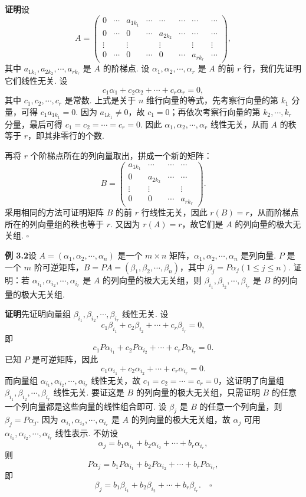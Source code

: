 \documentclass[UTF8,12pt,a4paper,fontset=fandol]{ctexart}
\begin{document}
\noindent\textbf{证明}\quad 设
\[
A=
\begin{pmatrix}
0 & \cdots & a_{1k_1} & \cdots & \cdots & \cdots & \cdots & \cdots\\
0 & \cdots & 0 & \cdots & a_{2k_2} & \cdots & \cdots & \cdots\\
\vdots &        & \vdots &        & \vdots &        & \vdots & \vdots\\
0 & \cdots & 0 & \cdots & 0 & \cdots & a_{rk_r} & \cdots
\end{pmatrix},
\]
其中 $a_{1k_1},a_{2k_2},\cdots,a_{rk_r}$ 是 $A$ 的阶梯点. 设 $\alpha_1,\alpha_2,\cdots,\alpha_r$ 是 $A$ 的前 $r$ 行，我们先证明它们线性无关. 设
\[
c_1\alpha_1+c_2\alpha_2+\cdots+c_r\alpha_r=0,
\]
其中 $c_1,c_2,\cdots,c_r$ 是常数. 上式是关于 $n$ 维行向量的等式，先考察行向量的第 $k_1$ 分量，可得 $c_1a_{1k_1}=0$. 因为 $a_{1k_1}\ne 0$，故 $c_1=0$；再依次考察行向量的第 $k_2,\cdots,k_r$ 分量，最后可得 $c_1=c_2=\cdots=c_r=0$. 因此 $\alpha_1,\alpha_2,\cdots,\alpha_r$ 线性无关，从而 $A$ 的秩等于 $r$，即其非零行的个数.

再将 $r$ 个阶梯点所在的列向量取出，拼成一个新的矩阵：
\[
B=
\begin{pmatrix}
a_{1k_1} & \cdots & \cdots & \cdots\\
0 & a_{2k_2} & \cdots & \cdots\\
\vdots & \vdots &        & \vdots\\
0 & 0 & \cdots & a_{rk_r}
\end{pmatrix}.
\]
采用相同的方法可证明矩阵 $B$ 的前 $r$ 行线性无关，因此 $r(B)=r$，从而阶梯点所在的列向量组的秩也等于 $r$. 又因为 $r(A)=r$，故它们是 $A$ 的列向量的极大无关组. $\square$

\noindent\textbf{例 3.2}\quad 设 $A=(\alpha_1,\alpha_2,\cdots,\alpha_n)$ 是一个 $m\times n$ 矩阵，$\alpha_1,\alpha_2,\cdots,\alpha_n$ 是列向量. $P$ 是一个 $m$ 阶可逆矩阵，$B=PA=(\beta_1,\beta_2,\cdots,\beta_n)$，其中 $\beta_j=P\alpha_j(1\le j\le n)$. 证明：若 $\alpha_{i_1},\alpha_{i_2},\cdots,\alpha_{i_r}$ 是 $A$ 的列向量的极大无关组，则 $\beta_{i_1},\beta_{i_2},\cdots,\beta_{i_r}$ 是 $B$ 的列向量的极大无关组.

\noindent\textbf{证明}\quad 先证明向量组 $\beta_{i_1},\beta_{i_2},\cdots,\beta_{i_r}$ 线性无关. 设
\[
c_1\beta_{i_1}+c_2\beta_{i_2}+\cdots+c_r\beta_{i_r}=0,
\]
即
\[
c_1P\alpha_{i_1}+c_2P\alpha_{i_2}+\cdots+c_rP\alpha_{i_r}=0.
\]
已知 $P$ 是可逆矩阵，因此
\[
c_1\alpha_{i_1}+c_2\alpha_{i_2}+\cdots+c_r\alpha_{i_r}=0.
\]
而向量组 $\alpha_{i_1},\alpha_{i_2},\cdots,\alpha_{i_r}$ 线性无关，故 $c_1=c_2=\cdots=c_r=0$，这证明了向量组 $\beta_{i_1},\beta_{i_2},\cdots,\beta_{i_r}$ 线性无关. 要证这是 $B$ 的列向量的极大无关组，只需证明 $B$ 的任意一个列向量都是这些向量的线性组合即可. 设 $\beta_j$ 是 $B$ 的任意一个列向量，则 $\beta_j=P\alpha_j$. 因为 $\alpha_{i_1},\alpha_{i_2},\cdots,\alpha_{i_r}$ 是 $A$ 的列向量的极大无关组，故 $\alpha_j$ 可用 $\alpha_{i_1},\alpha_{i_2},\cdots,\alpha_{i_r}$ 线性表示. 不妨设
\[
\alpha_j=b_1\alpha_{i_1}+b_2\alpha_{i_2}+\cdots+b_r\alpha_{i_r},
\]
则
\[
P\alpha_j=b_1P\alpha_{i_1}+b_2P\alpha_{i_2}+\cdots+b_rP\alpha_{i_r},
\]
即
\[
\beta_j=b_1\beta_{i_1}+b_2\beta_{i_2}+\cdots+b_r\beta_{i_r}. \quad \square
\]
\end{document}
